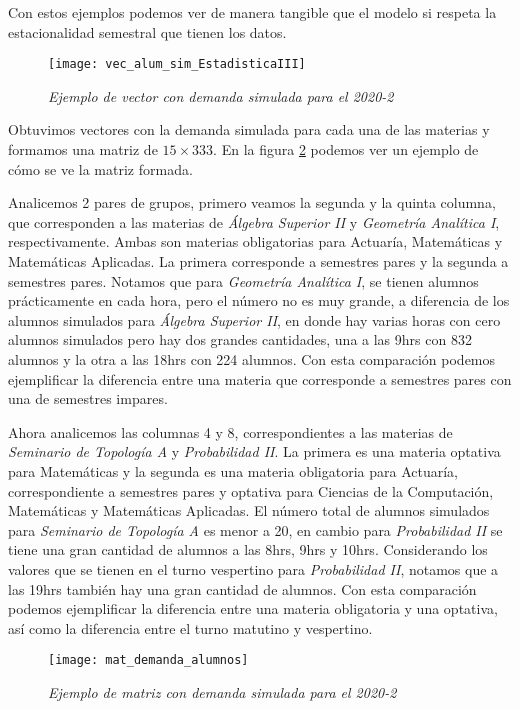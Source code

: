Con estos ejemplos podemos ver de manera tangible que el modelo si respeta la estacionalidad semestral que tienen los datos.

\begin{figure}[H]
\centering
\texttt{[image: vec\_alum\_sim\_EstadisticaIII]} %
\caption{\textit{Ejemplo de vector con demanda simulada para el 2020-2}}\label{vec_alum_sim}
\end{figure}

Obtuvimos vectores con la demanda simulada para cada una de las materias y formamos una matriz de $15 \times 333$. En la figura \ref{matDemandaAlum} podemos ver un ejemplo de cómo se ve la matriz formada.

Analicemos 2 pares de grupos, primero veamos la segunda y la quinta columna, que corresponden a las materias de \textit{Álgebra Superior II} y \textit{Geometría Analítica I}, respectivamente. Ambas son materias obligatorias para Actuaría, Matemáticas y Matemáticas Aplicadas. La primera corresponde a semestres pares y la segunda a semestres pares. Notamos que para \textit{Geometría Analítica I}, se tienen alumnos prácticamente en cada hora, pero el número no es muy grande, a diferencia de los alumnos simulados para \textit{Álgebra Superior II}, en donde hay varias horas con cero alumnos simulados pero hay dos grandes cantidades, una a las 9hrs con 832 alumnos y la otra a las 18hrs con 224 alumnos. Con esta comparación podemos ejemplificar la diferencia entre una materia que corresponde a semestres pares con una de semestres impares.

Ahora analicemos las columnas 4 y 8, correspondientes a las materias de \textit{Seminario de Topología A} y \textit{Probabilidad II}. La primera es una materia optativa para Matemáticas y la segunda es una materia obligatoria para Actuaría, correspondiente a semestres pares y optativa para Ciencias de la Computación, Matemáticas y Matemáticas Aplicadas. El número total de alumnos simulados para \textit{Seminario de Topología A} es menor a 20, en cambio para \textit{Probabilidad II} se tiene una gran cantidad de alumnos a las 8hrs, 9hrs y 10hrs. Considerando los valores que se tienen en el turno vespertino para \textit{Probabilidad II}, notamos que a las 19hrs también hay una gran cantidad de alumnos. Con esta comparación podemos ejemplificar la diferencia entre una materia obligatoria y una optativa, así como la diferencia entre el turno matutino y vespertino.


\begin{figure}[H]
\centering
\texttt{[image: mat\_demanda\_alumnos]} %
\caption{\textit{Ejemplo de matriz con demanda simulada para el 2020-2}}\label{matDemandaAlum}
\end{figure}
